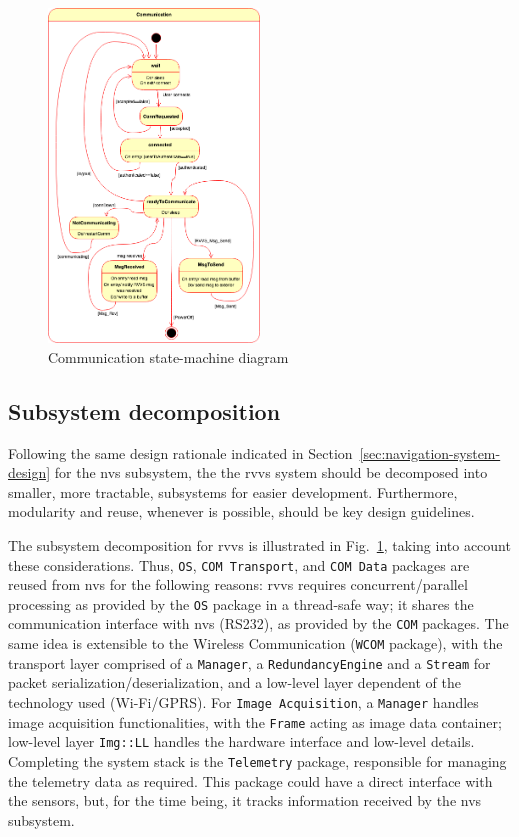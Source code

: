 \begin{figure}[!hbt]
\centering
    \includegraphics[width=0.5\textwidth]{./img/rvvs-comm-state-diag.png}
  \caption{Communication state-machine diagram}%
\label{fig:rvvs-comm-state-diag}
\end{figure}
%
\subsection{Subsystem decomposition}%
\label{sec:subsyst-decomposition-rvvs}
Following the same design rationale indicated in
Section~\ref{sec:navigation-system-design} for the \gls{nvs} subsystem, the
the \gls{rvvs} system should be decomposed into smaller, more tractable,
subsystems for easier development. Furthermore, modularity and reuse, whenever
is possible, should be key design guidelines.

The subsystem decomposition for
\gls{rvvs} is illustrated in Fig.~\ref{fig:rvvs-comm-state-diag}, taking into
account these considerations. Thus, \texttt{OS}, \texttt{COM Transport}, and
\texttt{COM Data} packages are reused from \gls{nvs} for the following reasons:
\gls{rvvs} requires concurrent/parallel processing as provided by the
\texttt{OS} package in a thread-safe way; it shares the communication interface
with \gls{nvs} (RS232), as provided by the \texttt{COM} packages. The same idea
is extensible to the Wireless Communication (\texttt{WCOM} package), with the
transport layer comprised of a \texttt{Manager}, a \texttt{RedundancyEngine} and
a \texttt{Stream} for packet serialization/deserialization, and a low-level
layer dependent of the technology used (Wi-Fi/GPRS). For \texttt{Image
  Acquisition}, a \texttt{Manager} handles image acquisition functionalities,
with the \texttt{Frame} acting as image data container; low-level layer
\texttt{Img::LL} handles the hardware interface and low-level
details. Completing the system stack is the \texttt{Telemetry} package,
responsible for managing the telemetry data as required. This package could have
a direct interface with the sensors, but, for the time being, it tracks
information received by the \gls{nvs} subsystem.

